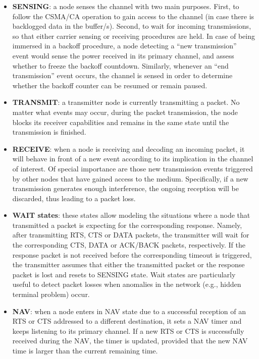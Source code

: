 \documentclass[conference]{IEEEtran}
\begin{document}
	\begin{itemize}
		
		\item \textbf{SENSING}: a node senses the channel with two main purposes. First, to follow the CSMA/CA operation to gain access to the channel (in case there is backlogged data in the buffer/s). Second, to wait for incoming transmissions, so that either carrier sensing or receiving procedures are held. In case of being immersed in a backoff procedure, a node detecting a ``new transmission'' event would sense the power received in its primary channel, and assess whether to freeze the backoff countdown. Similarly, whenever an ``end transmission'' event occurs, the channel is sensed in order to determine whether the backoff counter can be resumed or remain paused.
		
		\item \textbf{TRANSMIT}: a transmitter node is currently transmitting a packet. No matter what events may occur, during the packet transmission, the node blocks its receiver capabilities and remains in the same state until the transmission is finished.
		
		\item \textbf{RECEIVE}: when a node is receiving and decoding an incoming packet, it will behave in front of a new event according to its implication in the channel of interest. Of special importance are those new transmission events triggered by other nodes that have gained access to the medium. Specifically, if a new transmission generates enough interference, the ongoing reception will be discarded, thus leading to a packet loss. 
		
		\item \textbf{WAIT states}: these states allow modeling the situations where a node that transmitted a packet is expecting for the corresponding response. Namely, after transmitting RTS, CTS or DATA packets, the transmitter will wait for the corresponding CTS, DATA or ACK/BACK packets, respectively. If the response packet is not received before the corresponding timeout is triggered, the transmitter assumes that either the transmitted packet or the response packet is lost and resets to SENSING state. Wait states are particularly useful to detect packet losses when anomalies in the network (e.g., hidden terminal problem) occur.
		
		\item \textbf{NAV}: when a node enters in NAV state due to a successful reception of an RTS or CTS addressed to a different destination, it sets a NAV timer and keeps listening to its primary channel. If a new RTS or CTS is successfully received during the NAV, the timer is updated, provided that the new NAV time is larger than the current remaining time.
	\end{itemize}
	
\end{document}
